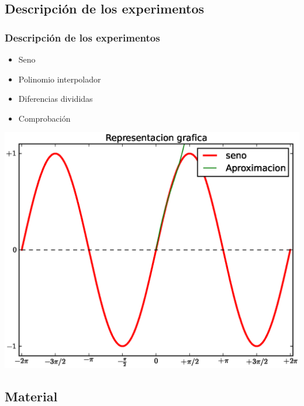 \documentclass{beamer}
\begin{document}
\subsection{Descripción de los experimentos}
\begin{frame}
\frametitle{Descripción de los experimentos}
\begin{itemize}
  \item <1-> Seno
  \item <2-> Polinomio interpolador
  \item <3-> Diferencias divididas
  \item <4-> Comprobación  
\end{itemize}
\includegraphics[scale=0.35]{img/representacionseno.eps}
\end{frame}

\subsection{Material}
\end{document}
